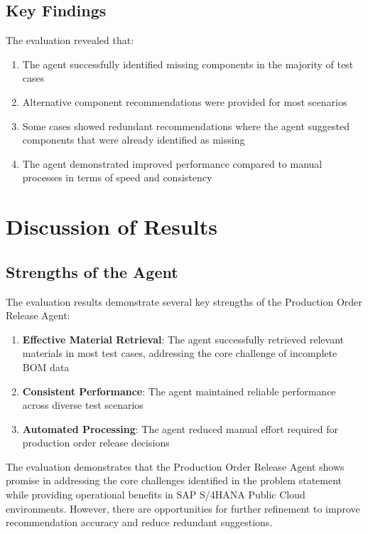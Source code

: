 \subsection{Key Findings}

The evaluation revealed that:

\begin{enumerate}
    \item The agent successfully identified missing components in the majority of test cases
    \item Alternative component recommendations were provided for most scenarios
    \item Some cases showed redundant recommendations where the agent suggested components that were already identified as missing
    \item The agent demonstrated improved performance compared to manual processes in terms of speed and consistency
\end{enumerate}

\section{Discussion of Results}

\subsection{Strengths of the Agent}

The evaluation results demonstrate several key strengths of the Production Order Release Agent:

\begin{enumerate}
    \item \textbf{Effective Material Retrieval}: The agent successfully retrieved relevant materials in most test cases, addressing the core challenge of incomplete BOM data
    \item \textbf{Consistent Performance}: The agent maintained reliable performance across diverse test scenarios
    \item \textbf{Automated Processing}: The agent reduced manual effort required for production order release decisions
\end{enumerate}

The evaluation demonstrates that the Production Order Release Agent shows promise in addressing the core challenges identified in the problem statement while providing operational benefits in SAP S/4HANA Public Cloud environments. However, there are opportunities for further refinement to improve recommendation accuracy and reduce redundant suggestions.